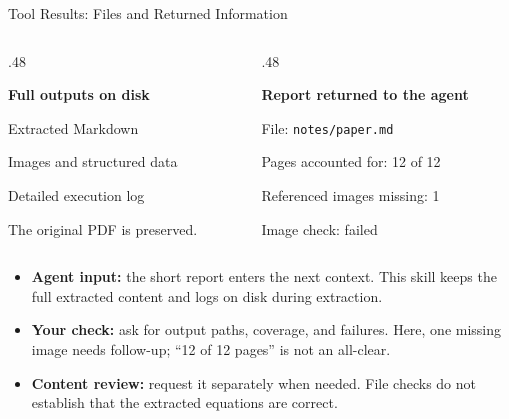 \begin{frame}{Tool Results: Files and Returned Information}
\small
{}\par\smallskip
\begin{columns}[T,onlytextwidth]
\begin{column}{.48\textwidth}
\begin{conceptbox}\raggedright \textbf{Full outputs on disk}\par\medskip
Extracted Markdown\par
Images and structured data\par
Detailed execution log
\par\medskip
The original PDF is preserved.
\end{conceptbox}
\end{column}
\begin{column}{.48\textwidth}
\begin{conceptbox}\raggedright \textbf{Report returned to the agent}\par\medskip
File: \texttt{notes/paper.md}\par
Pages accounted for: 12 of 12\par
Referenced images missing: 1\par
Image check: failed
\end{conceptbox}
\end{column}
\end{columns}
\par\medskip
\begin{itemize}
\item \textbf{Agent input:} the short report enters the next context. This skill keeps the full extracted content and logs on disk during extraction.
\item \textbf{Your check:} ask for output paths, coverage, and failures. Here, one missing image needs follow-up; ``12 of 12 pages'' is not an all-clear.
\item \textbf{Content review:} request it separately when needed. File checks do not establish that the extracted equations are correct.
\end{itemize}
\end{frame}

